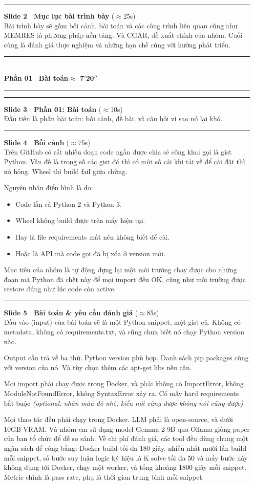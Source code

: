 \documentclass[11pt]{article}
\newcommand{\stagenote}[1]{{\small\itshape\color{gray}#1}}
\newcommand{\parthead}[2]{%
  \vspace{1.4em}\par
  {\noindent\color{navydeep}\rule{\linewidth}{1.4pt}}\\[0.35em]
  {\bfseries\Large\color{navydeep}#1}\hfill{\normalsize\color{accent}\bfseries #2}\\[-0.35em]
  {\noindent\color{navydeep}\rule{\linewidth}{1.4pt}}
  \par\vspace{0.6em}%
}
\newcommand{\slidehead}[3]{%
  \vspace{1.05em}\par\noindent
  {\color{accent}\rule[-0.18em]{3pt}{1.05em}}\hspace{0.5em}%
  {\bfseries\large\color{navydeep}Slide #1 \textperiodcentered\ #2}%
  \hfill{\small\color{gray}(#3)}\\[0.25em]%
}
\begin{document}
\slidehead{2}{Mục lục bài trình bày}{$\approx$25s}
Bài trình bày sẽ gồm bối cảnh, bài toán và các công trình liên quan cũng như MEMRES là phương pháp nền tảng. Và CGAR, đề xuất chính của nhóm. Cuối cùng là đánh giá thực nghiệm và những hạn chế cùng với hướng phát triển.

\parthead{Phần 01 \textperiodcentered\ Bài toán}{$\approx$ 7$'$20$''$}

\slidehead{3}{Phần 01: Bài toán}{$\approx$10s}
Đầu tiên là phần bài toán: bối cảnh, đề bài, và câu hỏi vì sao nó lại khó.

\slidehead{4}{Bối cảnh}{$\approx$75s}
Trên GitHub có rất nhiều đoạn code ngắn được chia sẻ công khai gọi là gist Python. Vấn đề là trong số các gist đó thì có một số cái khi tải về để cài đặt thì nó hỏng. Wheel thì build fail giữa chừng.

Nguyên nhân điển hình là do:
\begin{itemize}
  \item Code lẫn cả Python 2 và Python 3.
  \item Wheel không build được trên máy hiện tại.
  \item Hay là file requirements mất nên không biết để cài.
  \item Hoặc là API mà code gọi đã bị xóa ở version mới.
\end{itemize}
Mục tiêu của nhóm là tự động dựng lại một môi trường chạy được cho những đoạn mã Python đã chết này để mọi import đều OK, cũng như môi trường được restore đúng như lúc code còn active.

\slidehead{5}{Bài toán \& yêu cầu đánh giá}{$\approx$85s}
Đầu vào (input) của bài toán sẽ là một Python snippet, một gist cũ. Không có metadata, không có requirements.txt, và cũng chưa biết nó chạy Python version nào.

Output cần trả về ba thứ. Python version phù hợp. Danh sách pip packages cùng với version của nó. Và tùy chọn thêm các apt-get libs nếu cần.

Mọi import phải chạy được trong Docker, và phải không có ImportError, không ModuleNotFoundError, không SyntaxError xảy ra. Có mấy hard requirements bắt buộc \stagenote{(optional: nhãn màu đỏ nhé, kiểu nói cũng được không nói cũng được)}

Mọi thao tác đều phải chạy trong Docker. LLM phải là open-source, và dưới 10GB VRAM. Và nhóm em sử dụng model Gemma-2 9B qua Ollama giống paper của ban tổ chức để dễ so sánh. Về chi phí đánh giá, các tool đều dùng chung một ngân sách để công bằng: Docker build tối đa 180 giây, nhiều nhất mười lần build mỗi snippet, số bước suy luận logic ký hiệu là K solve tối đa 50 và mấy bước này không đụng tới Docker, chạy một worker, và tổng khoảng 1800 giây mỗi snippet. Metric chính là pass rate, phụ là thời gian trung bình mỗi snippet.
\end{document}
